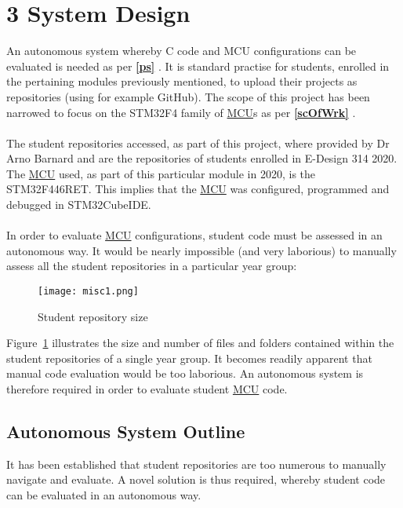 

\chapter*{3 System Design}
\label{system3}
\setcounter{chapter}{3}
\setcounter{section}{0}
\setcounter{figure}{0}
\setcounter{table}{0}
An autonomous system whereby C code and MCU configurations can be evaluated is needed as per \textbf{\ref{ps} }. It is standard practise for students, enrolled in the pertaining modules previously mentioned, to upload their projects as repositories (using for example GitHub). The scope of this project has been narrowed to focus on the STM32F4 family of \hyperref[listAbr]{MCU}s as per \textbf{\ref{scOfWrk} }. 
\\\\
The student repositories accessed, as part of this project, where provided by Dr Arno Barnard and are the repositories of students enrolled in E-Design 314 2020. The \hyperref[listAbr]{MCU} used, as part of this particular module in 2020, is the STM32F446RET. This implies that the \hyperref[listAbr]{MCU} was configured, programmed and debugged in STM32CubeIDE.
\\\\
In order to evaluate \hyperref[listAbr]{MCU} configurations, student code must be assessed in an autonomous way. It would be nearly impossible (and very laborious) to manually assess all the student repositories in a particular year group:

\begin{figure}[H]
\begin{center}
\texttt{[image: misc1.png]}
\caption{Student repository size}
\label{stdSize}
\end{center}
\end{figure}

Figure~\ref{stdSize} illustrates the size and number of files and folders contained within the student repositories of a single year group. It becomes readily apparent that manual code evaluation would be too laborious. An autonomous system is therefore required in order to evaluate student \hyperref[listAbr]{MCU} code.


\section{Autonomous System Outline}
\label{aso}
It has been established that student repositories are too numerous to manually navigate and evaluate. A novel solution is thus required, whereby student code can be evaluated in an autonomous way. 

